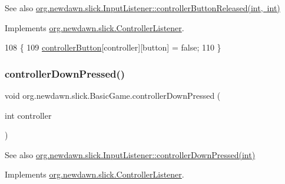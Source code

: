 \begin{DoxySeeAlso}{See also}
\mbox{\hyperlink{interfaceorg_1_1newdawn_1_1slick_1_1_controller_listener_a34020453a6c40e12b149c334a4adc246}{org.\+newdawn.\+slick.\+Input\+Listener\+::controller\+Button\+Released(int, int)}} 
\end{DoxySeeAlso}


Implements \mbox{\hyperlink{interfaceorg_1_1newdawn_1_1slick_1_1_controller_listener_a34020453a6c40e12b149c334a4adc246}{org.\+newdawn.\+slick.\+Controller\+Listener}}.


\begin{DoxyCode}
108                                                                      \{
109         \mbox{\hyperlink{classorg_1_1newdawn_1_1slick_1_1_basic_game_a77093ea9bb39adc83d2c1a0212efdf01}{controllerButton}}[controller][button] = \textcolor{keyword}{false};
110     \}
\end{DoxyCode}
\mbox{\label{classorg_1_1newdawn_1_1slick_1_1_basic_game_af4db3e5b864b3ee179de6935184727ac}} 
\subsubsection{\texorpdfstring{controller\+Down\+Pressed()}{controllerDownPressed()}}
{\footnotesize\ttfamily void org.\+newdawn.\+slick.\+Basic\+Game.\+controller\+Down\+Pressed (\begin{DoxyParamCaption}\item[{int}]{controller }\end{DoxyParamCaption})\hspace{0.3cm}{\ttfamily [inline]}}

\begin{DoxySeeAlso}{See also}
\mbox{\hyperlink{interfaceorg_1_1newdawn_1_1slick_1_1_controller_listener_a9c619e7cb29b3c8b68bc24f9a4e238d7}{org.\+newdawn.\+slick.\+Input\+Listener\+::controller\+Down\+Pressed(int)}} 
\end{DoxySeeAlso}


Implements \mbox{\hyperlink{interfaceorg_1_1newdawn_1_1slick_1_1_controller_listener_a9c619e7cb29b3c8b68bc24f9a4e238d7}{org.\+newdawn.\+slick.\+Controller\+Listener}}.


